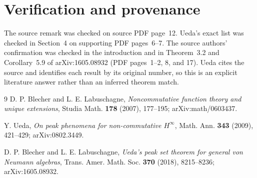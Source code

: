 \documentclass[11pt]{article}
\begin{document}
\section*{Verification and provenance}

The source remark was checked on source PDF page~12.  Ueda's exact list was
checked in Section~4 on supporting PDF pages~6--7.  The source authors'
confirmation was checked in the introduction and in Theorem~3.2 and
Corollary~5.9 of arXiv:1605.08932 (PDF pages~1--2, 8, and 17).  Ueda cites the
source and identifies each result by its original number, so this is an
explicit literature answer rather than an inferred theorem match.

\begin{thebibliography}{9}
D. P. Blecher and L. E. Labuschagne,
\emph{Noncommutative function theory and unique extensions},
Studia Math. \textbf{178} (2007), 177--195;
arXiv:math/0603437.

Y. Ueda,
\emph{On peak phenomena for non-commutative $H^\infty$},
Math. Ann. \textbf{343} (2009), 421--429;
arXiv:0802.3449.

D. P. Blecher and L. E. Labuschagne,
\emph{Ueda's peak set theorem for general von Neumann algebras},
Trans. Amer. Math. Soc. \textbf{370} (2018), 8215--8236;
arXiv:1605.08932.
\end{thebibliography}
\end{document}
